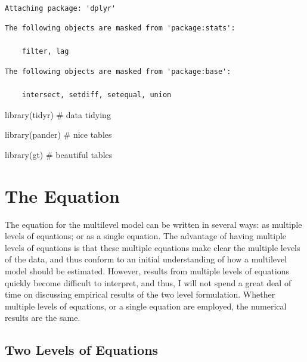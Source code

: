 \documentclass[
  letterpaper,
  DIV=11,
  numbers=noendperiod]{scrreprt}
\newenvironment{Shaded}{\begin{snugshade}}{\end{snugshade}}
\newcommand{\CommentTok}[1]{\textcolor[rgb]{0.37,0.37,0.37}{#1}}
\newcommand{\FunctionTok}[1]{\textcolor[rgb]{0.28,0.35,0.67}{#1}}
\newcommand{\NormalTok}[1]{\textcolor[rgb]{0.00,0.23,0.31}{#1}}
\begin{document}
\begin{verbatim}

Attaching package: 'dplyr'
\end{verbatim}

\begin{verbatim}
The following objects are masked from 'package:stats':

    filter, lag
\end{verbatim}

\begin{verbatim}
The following objects are masked from 'package:base':

    intersect, setdiff, setequal, union
\end{verbatim}

\begin{Shaded}
\begin{Highlighting}[]
\FunctionTok{library}\NormalTok{(tidyr) }\CommentTok{\# data tidying}

\FunctionTok{library}\NormalTok{(pander) }\CommentTok{\# nice tables}

\FunctionTok{library}\NormalTok{(gt) }\CommentTok{\# beautiful tables}
\end{Highlighting}
\end{Shaded}

\hypertarget{the-equation}{%
\section{The Equation}\label{the-equation}}

The equation for the multilevel model can be written in several ways: as
multiple levels of equations; or as a single equation. The advantage of
having multiple levels of equations is that these multiple equations
make clear the multiple levels of the data, and thus conform to an
initial understanding of how a multilevel model should be estimated.
However, results from multiple levels of equations quickly become
difficult to interpret, and thus, I will not spend a great deal of time
on discussing empirical results of the two level formulation. Whether
multiple levels of equations, or a single equation are employed, the
numerical results are the same.

\hypertarget{two-levels-of-equations}{%
\subsection{Two Levels of Equations}\label{two-levels-of-equations}}
\end{document}
